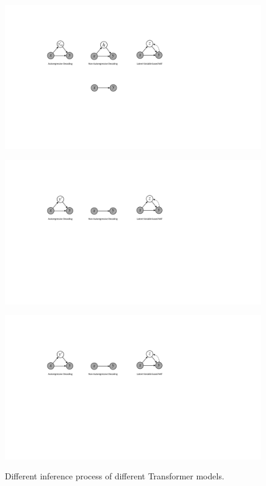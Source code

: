 \begin{figure}[tbp]
    \centering
    \small
    \begin{minipage}{0.3\linewidth}
    \centering
    \includegraphics[width=\linewidth]{figures/AT-Inference.pdf}
    \label{fig:at}
    \end{minipage}
    \hfill
    \begin{minipage}{0.3\linewidth}
    \centering
    \includegraphics[width=\linewidth]{figures/NAT-Decoding.pdf}
    \label{fig:nat}
    \end{minipage}
    \hfill
    \begin{minipage}{0.3\linewidth}
    \centering
    \includegraphics[width=\linewidth]{figures/LT-Decoding.pdf}
    \label{fig:lt}
    \end{minipage}
\caption{Different inference process of different Transformer models.}
\label{fig:lm}
\end{figure}

